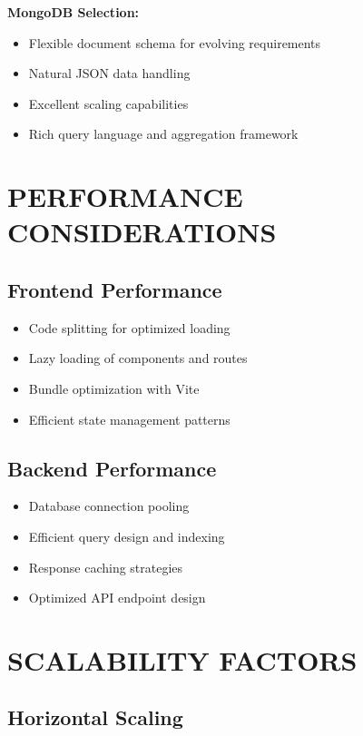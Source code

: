 \textbf{MongoDB Selection:}
\begin{itemize}
\item Flexible document schema for evolving requirements
\item Natural JSON data handling
\item Excellent scaling capabilities
\item Rich query language and aggregation framework
\end{itemize}

\section{PERFORMANCE CONSIDERATIONS}

\subsection{Frontend Performance}

\begin{itemize}
\item Code splitting for optimized loading
\item Lazy loading of components and routes
\item Bundle optimization with Vite
\item Efficient state management patterns
\end{itemize}

\subsection{Backend Performance}

\begin{itemize}
\item Database connection pooling
\item Efficient query design and indexing
\item Response caching strategies
\item Optimized API endpoint design
\end{itemize}

\section{SCALABILITY FACTORS}

\subsection{Horizontal Scaling}

